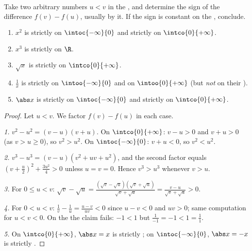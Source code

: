 \begin{method}\label{met:g11:func:variation}
Take two arbitrary numbers $u < v$ in the , and determine the sign
of the difference $f(v) - f(u)$, usually by \emph{} it. If the
sign is constant on the , conclude.
\end{method}

\begin{proposition}\label{prop:g11:func:refvariations}
\begin{enumerate}
  \item $x^2$ is strictly  on $\intoc{-\infty}{0}$ and strictly
         on $\intco{0}{+\infty}$.
  \item $x^3$ is strictly  on $\R$.
  \item $\sqrt x$ is strictly  on $\intco{0}{+\infty}$.
  \item $\frac1x$ is strictly  on $\intoo{-\infty}{0}$ and on
        $\intoo{0}{+\infty}$ (but \emph{not} on their ).
  \item $\abs x$ is strictly  on $\intoc{-\infty}{0}$ and
        strictly  on $\intco{0}{+\infty}$.
\end{enumerate}
\end{proposition}

\begin{proof}
Let $u < v$. We factor $f(v) - f(u)$ in each case.

\emph{1.} $v^2 - u^2 = (v-u)(v+u)$. On $\intco{0}{+\infty}$: $v - u > 0$
and $v + u > 0$ (as $v > u \geq 0$), so $v^2 > u^2$. On
$\intoc{-\infty}{0}$: $v + u < 0$, so $v^2 < u^2$.

\emph{2.} $v^3 - u^3 = (v - u)(v^2 + uv + u^2)$, and the second factor
equals $\left(v + \frac u2\right)^2 + \frac{3u^2}{4} > 0$ unless
$u = v = 0$. Hence $v^3 > u^3$ whenever $v > u$.

\emph{3.} For $0 \leq u < v$:
$\sqrt v - \sqrt u = \frac{(\sqrt v - \sqrt u)(\sqrt v + \sqrt u)}
{\sqrt v + \sqrt u} = \frac{v - u}{\sqrt v + \sqrt u} > 0$.

\emph{4.} For $0 < u < v$:
$\frac1v - \frac1u = \frac{u - v}{uv} < 0$ since $u - v < 0$ and $uv > 0$;
same computation for $u < v < 0$. On the  the claim fails:
$-1 < 1$ but $\frac{1}{-1} = -1 < 1 = \frac11$.

\emph{5.} On $\intco{0}{+\infty}$, $\abs x = x$ is strictly ; on
$\intoc{-\infty}{0}$, $\abs x = -x$ is strictly .
\end{proof}

